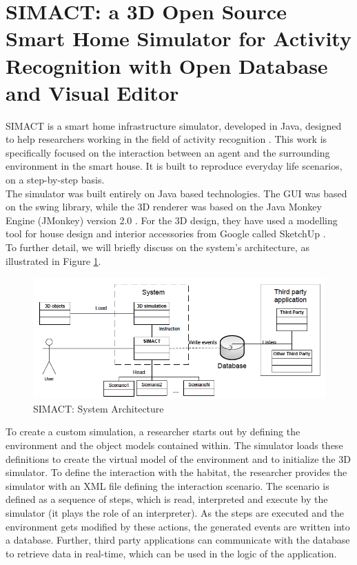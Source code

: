 \section{SIMACT: a 3D Open Source Smart Home Simulator for Activity Recognition with Open Database and Visual Editor}\label{sec:simact}

SIMACT is a smart home infrastructure simulator, developed in Java, designed to help researchers working in the field of activity recognition \cite{bouchard2012simact}. This work is specifically focused on the interaction between an agent and the surrounding environment in the smart house. It is built to reproduce everyday life scenarios, on a step-by-step basis.\\

The simulator was built entirely on Java based technologies. The GUI was based on the swing library, while the 3D renderer was based on the Java Monkey Engine (JMonkey) version 2.0 \cite{jme:online}. For the 3D design, they have used a modelling tool for house design and interior accessories from Google called SketchUp \cite{sketchup:online}.\\

To further detail, we will briefly discuss on the system's architecture, as illustrated in Figure \ref{fig:simact_architecture}.

\begin{figure}[H]
	\centering
	\includegraphics[width=\linewidth]{gfx/Chapter2/simact_architecture}
	\caption{SIMACT: System Architecture}
	\label{fig:simact_architecture}
\end{figure}

To create a custom simulation, a researcher starts out by defining the environment and the object models contained within. The simulator loads these definitions to create the virtual model of the environment and to initialize the 3D simulator. To define the interaction with the habitat, the researcher provides the simulator with an XML file defining the interaction scenario. The scenario is defined as a sequence of steps, which is read, interpreted and execute by the simulator (it plays the role of an interpreter). As the steps are executed and the environment gets modified by these actions, the generated events are written into a database. Further, third party applications can communicate with the database to retrieve data in real-time, which can be used in the logic of the application.\\

